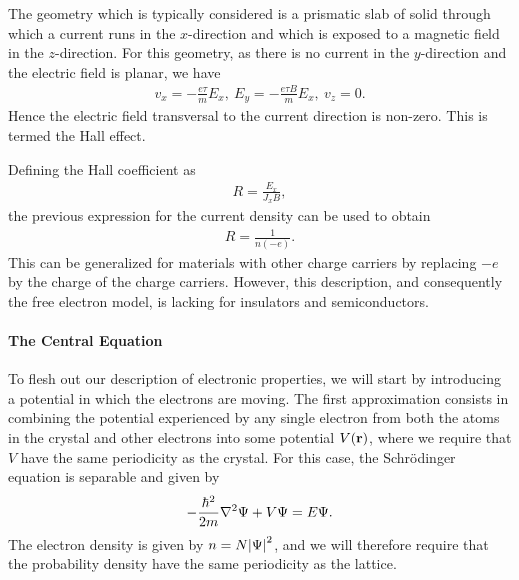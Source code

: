 The geometry which is typically considered is a prismatic slab of solid through which a current runs in the $x$-direction and which is exposed to a magnetic field in the $z$-direction. For this geometry, as there is no current in the $y$-direction and the electric field is planar, we have
\begin{align*}
	v_{x} = -\frac{e\tau}{m}E_{x},\ E_{y} = -\frac{e\tau B}{m}E_{x},\ v_{z} = 0.
\end{align*}
Hence the electric field transversal to the current direction is non-zero. This is termed the Hall effect.

Defining the Hall coefficient as
\begin{align*}
	R = \frac{E_{x}}{J_{x}B},
\end{align*}
the previous expression for the current density can be used to obtain
\begin{align*}
	R = \frac{1}{n(-e)}.
\end{align*}
This can be generalized for materials with other charge carriers by replacing $-e$ by the charge of the charge carriers. However, this description, and consequently the free electron model, is lacking for insulators and semiconductors.

\paragraph{The Central Equation}
To flesh out our description of electronic properties, we will start by introducing a potential in which the electrons are moving. The first approximation consists in combining the potential experienced by any single electron from both the atoms in the crystal and other electrons into some potential $V(\vb{r})$, where we require that $V$ have the same periodicity as the crystal. For this case, the Schrödinger equation is separable and given by
\begin{align*}
	-\frac{\hbar^{2}}{2m}\laplacian{\Psi} + V\Psi = E\Psi.
\end{align*}
The electron density is given by $n = N\abs{\Psi}^{2}$, and we will therefore require that the probability density have the same periodicity as the lattice.

